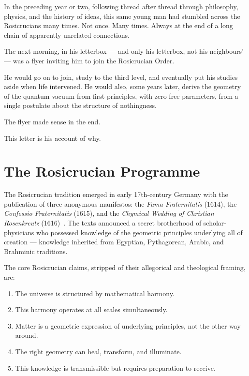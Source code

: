 \documentclass[12pt,twocolumn]{article}
\begin{document}
In the preceding year or two, following thread after thread
through philosophy, physics, and the history of ideas, this
same young man had stumbled across the Rosicrucians many times.
Not once. Many times. Always at the end of a long chain of
apparently unrelated connections.

The next morning, in his letterbox --- and only his letterbox,
not his neighbours' --- was a flyer inviting him to join the
Rosicrucian Order.

He would go on to join, study to the third level, and eventually
put his studies aside when life intervened. He would also,
some years later, derive the geometry of the quantum vacuum
from first principles, with zero free parameters, from a single
postulate about the structure of nothingness.

The flyer made sense in the end.

This letter is his account of why.

\section{The Rosicrucian Programme}

The Rosicrucian tradition emerged in early 17th-century Germany
with the publication of three anonymous manifestos: the
\textit{Fama Fraternitatis} (1614), the \textit{Confessio
Fraternitatis} (1615), and the \textit{Chymical Wedding of
Christian Rosenkreutz} (1616)~\cite{Fama1614}. The texts
announced a secret brotherhood of scholar-physicians who
possessed knowledge of the geometric principles underlying
all of creation --- knowledge inherited from Egyptian,
Pythagorean, Arabic, and Brahminic traditions.

The core Rosicrucian claims, stripped of their allegorical
and theological framing, are:

\begin{enumerate}\setlength\itemsep{2pt}
  \item The universe is structured by mathematical harmony.
  \item This harmony operates at all scales simultaneously.
  \item Matter is a geometric expression of underlying
        principles, not the other way around.
  \item The right geometry can heal, transform, and illuminate.
  \item This knowledge is transmissible but requires
        preparation to receive.
\end{enumerate}
\end{document}
